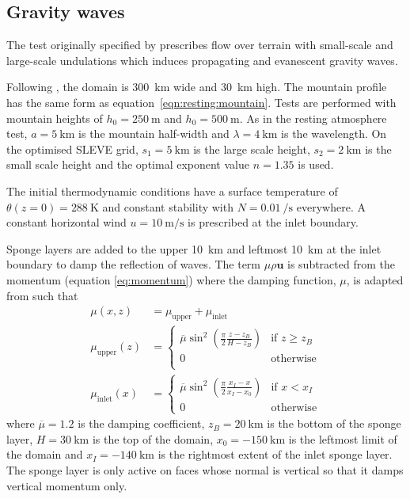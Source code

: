 \documentclass[twocol]{ametsoc}
\begin{document}
\subsection{Gravity waves}
The test originally specified by \citet{schaer2002} prescribes flow over terrain with small-scale and large-scale undulations which induces propagating and evanescent gravity waves.

Following \citet{melvin2010}, the domain is \SI{300}{\kilo\meter} wide and \SI{30}{\kilo\meter} high.  The mountain profile has the same form as equation~\ref{eqn:resting:mountain}.  Tests are performed with mountain heights of $h_0 = \SI{250}{\meter}$ and \(h_0 = \SI{500}{\meter}\).  As in the resting atmosphere test, $a = \SI{5}{\kilo\meter}$ is the mountain half-width and $\lambda = \SI{4}{\kilo\meter}$ is the wavelength.  On the optimised SLEVE grid, $s_1 = \SI{5}{\kilo\meter}$ is the large scale height, $s_2 = \SI{2}{\kilo\meter}$ is the small scale height and the optimal exponent value $n = 1.35$ is used.

The initial thermodynamic conditions have a surface temperature of $\theta(z=0) = \SI{288}{\kelvin}$ and constant stability with $N = \SI{0.01}{\per\second}$ everywhere.  A constant horizontal wind $u = \SI{10}{\meter\per\second}$ is prescribed at the inlet boundary.

Sponge layers are added to the upper \SI{10}{\kilo\meter} and leftmost \SI{10}{\kilo\meter} at the inlet boundary to damp the reflection of waves.
The term $\mu \rho \bm{u}$ is subtracted from the momentum (equation \ref{eq:momentum}) where the damping function, \(\mu\), is adapted from \citet{melvin2010} such that
\begin{align}
	\mu(x, z) &= \mu_\mathrm{upper} + \mu_\mathrm{inlet} \\
	\mu_\mathrm{upper}(z) &= \begin{cases}
		\overline{\mu} \sin^2 \left( \frac{\pi}{2} \frac{z - z_B}{H - z_B} \right) & \text{if } z \geq z_B \\
		0 & \text{otherwise} \\
	\end{cases} \\
	\mu_\mathrm{inlet}(x) &= \begin{cases}
		\overline{\mu} \sin^2 \left( \frac{\pi}{2} \frac{x_I - x}{x_I - x_0} \right) & \text{if } x < x_I \\
		0 & \text{otherwise}
	\end{cases}
\end{align}
where $\overline{\mu} = 1.2$ is the damping coefficient, $z_B = \SI{20}{\kilo\meter}$ is the bottom of the sponge layer, $H = \SI{30}{\kilo\meter}$ is the top of the domain, $x_0 = \SI{-150}{\kilo\meter}$ is the leftmost limit of the domain and $x_I = \SI{-140}{\kilo\meter}$ is the rightmost extent of the inlet sponge layer.  The sponge layer is only active on faces whose normal is vertical so that it damps vertical momentum only.
\end{document}
